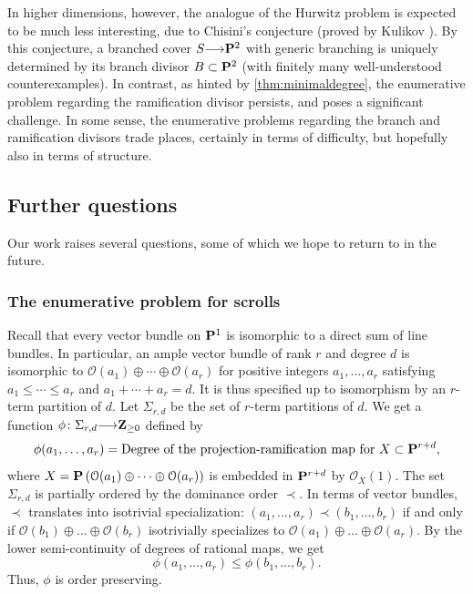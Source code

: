 \documentclass[11pt,reqno]{amsart}
\theoremstyle{plain}
\theoremstyle{definition}
\theoremstyle{remark}
\numberwithin{equation}{section}
\renewcommand{\to}{{\longrightarrow}}
\numberwithin{equation}{section}
\renewcommand{\O}{\mathcal O}
\begin{document}
In higher dimensions, however, the analogue of the Hurwitz problem is expected to be much less interesting, due to Chisini's conjecture (proved by Kulikov \cite{kul:08}).
By this conjecture, a branched cover $S \to \P^2$ with generic branching is uniquely determined by its branch divisor $B \subset \P^2$ (with finitely many well-understood counterexamples).
In contrast, as hinted by \autoref{thm:minimaldegree}, the enumerative problem regarding the ramification divisor persists, and poses a significant challenge.
In some sense, the enumerative problems regarding the branch and ramification divisors trade places, certainly in terms of difficulty, but hopefully also in terms of structure.


\subsection{Further questions}
Our work raises several questions, some of which we hope to return to in the future.
\subsubsection{The enumerative problem for scrolls}\label{sec:qscroll}
Recall that every vector bundle on $\P^1$ is isomorphic to a direct sum of line bundles.
In particular, an ample vector bundle of rank $r$ and degree $d$ is isomorphic to $\O(a_1) \oplus \cdots \oplus \O(a_r)$ for positive integers $a_1, \dots, a_r$ satisfying $a_1 \leq \cdots \leq a_r$ and $a_1 + \cdots + a_r = d$.
It is thus specified up to isomorphism by an $r$-term partition of $d$.
Let $\Sigma_{r,d}$ be the set of $r$-term partitions of $d$.
We get a function $\phi \from \Sigma_{r,d} \to \Z_{\geq 0}$ defined by
\[ \phi(a_1, \dots, a_r) = \text{Degree of the projection-ramification map for $X \subset \P^{r+d}$},\]
where $X = \P\left( \O(a_1) \oplus \dots \oplus \O(a_r) \right)$ is embedded in $\P^{r+d}$ by $\O_X(1)$.
The set $\Sigma_{r,d}$ is partially ordered by the dominance order $\prec$.
In terms of vector bundles, $\prec$ translates into isotrivial specialization: $(a_1, \dots, a_r) \prec (b_1, \dots, b_r)$ if and only if $\O(b_1) \oplus \dots \oplus \O(b_r)$ isotrivially specializes to $\O(a_1) \oplus \dots \oplus \O(a_r)$.
By the lower semi-continuity of degrees of rational maps, we get
\[ \phi(a_1, \dots, a_r) \leq \phi(b_1,\dots, b_r).\]
Thus, $\phi$ is order preserving.
\end{document}
